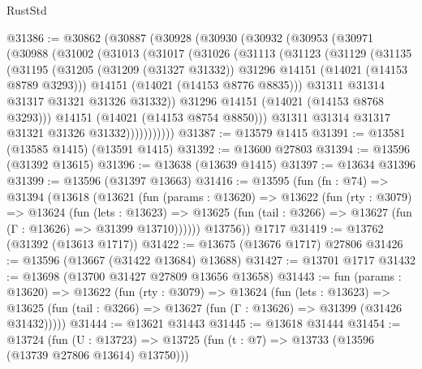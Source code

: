 \begin{lexlean}{RustStd}
\begin{coremodule}
@31386 := @30862
    (@30887
      (@30928
        (@30930
          (@30932
            (@30953
              (@30971
                (@30988
                  (@31002
                    (@31013
                      (@31017
                        (@31026
                          (@31113
                            (@31123
                              (@31129
                                (@31135
                                  (@31195
                                    (@31205
                                      (@31209 (@31327 @31332))
                                      @31296
                                      @14151
                                      (@14021 (@14153 @8789 @3293)))
                                    @14151
                                    (@14021 (@14153 @8776 @8835)))
                                  @31311
                                  @31314
                                  @31317
                                  @31321
                                  @31326
                                  @31332))
                              @31296
                              @14151
                              (@14021 (@14153 @8768 @3293)))
                            @14151
                            (@14021 (@14153 @8754 @8850)))
                          @31311
                          @31314
                          @31317
                          @31321
                          @31326
                          @31332)))))))))))
@31387 := @13579 @1415
@31391 := @13581 (@13585 @1415) (@13591 @1415)
@31392 := @13600 @27803
@31394 := @13596 (@31392 @13615)
@31396 := @13638 (@13639 @1415)
@31397 := @13634 @31396
@31399 := @13596 (@31397 @13663)
@31416 := @13595
    (fun (fn : @74) =>
    @31394
      (@13618
        (@13621
          (fun (params : @13620) =>
          @13622
            (fun (rty : @3079) =>
            @13624
              (fun (lets : @13623) =>
              @13625 (fun (tail : @3266) => @13627 (fun (Γ : @13626) => @31399 @13710))))))
        @13756))
    @1717
@31419 := @13762 (@31392 (@13613 @1717))
@31422 := @13675 (@13676 @1717) @27806
@31426 := @13596 (@13667 (@31422 @13684) @13688)
@31427 := @13701 @1717
@31432 := @13698 (@13700 @31427 @27809 @13656 @13658)
@31443 := fun (params : @13620) =>
  @13622
    (fun (rty : @3079) =>
    @13624
      (fun (lets : @13623) =>
      @13625 (fun (tail : @3266) => @13627 (fun (Γ : @13626) => @31399 (@31426 @31432)))))
@31444 := @13621 @31443
@31445 := @13618 @31444
@31454 := @13724
    (fun (U : @13723) => @13725 (fun (t : @7) => @13733 (@13596 (@13739 @27806 @13614) @13750)))

\end{coremodule}
\end{lexlean}
